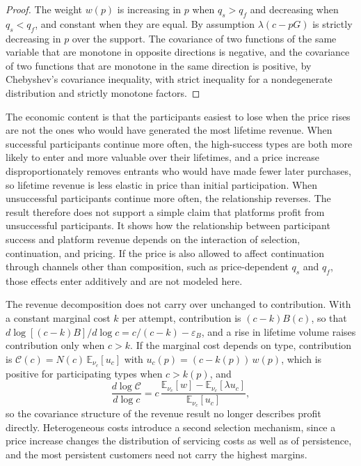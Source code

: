 \documentclass[11pt]{article}
\theoremstyle{remark}
\newcommand{\E}{\mathbb{E}}
\begin{document}
\begin{proof}
The weight $w(p)$ is increasing in $p$ when $q_s>q_f$ and decreasing when $q_s<q_f$, and constant when they are equal. By assumption $\lambda(c-pG)$ is strictly decreasing in $p$ over the support. The covariance of two functions of the same variable that are monotone in opposite directions is negative, and the covariance of two functions that are monotone in the same direction is positive, by Chebyshev's covariance inequality, with strict inequality for a nondegenerate distribution and strictly monotone factors.
\end{proof}

The economic content is that the participants easiest to lose when the price rises are not the ones who would have generated the most lifetime revenue. When successful participants continue more often, the high-success types are both more likely to enter and more valuable over their lifetimes, and a price increase disproportionately removes entrants who would have made fewer later purchases, so lifetime revenue is less elastic in price than initial participation. When unsuccessful participants continue more often, the relationship reverses. The result therefore does not support a simple claim that platforms profit from unsuccessful participants. It shows how the relationship between participant success and platform revenue depends on the interaction of selection, continuation, and pricing. If the price is also allowed to affect continuation through channels other than composition, such as price-dependent $q_s$ and $q_f$, those effects enter additively and are not modeled here.

The revenue decomposition does not carry over unchanged to contribution. With a constant marginal cost $k$ per attempt, contribution is $(c-k)B(c)$, so that $d\log[(c-k)B]/d\log c=c/(c-k)-\varepsilon_B$, and a rise in lifetime volume raises contribution only when $c>k$. If the marginal cost depends on type, contribution is $\mathcal C(c)=N(c)\,\E_{\nu_c}[u_c]$ with $u_c(p)=(c-k(p))\,w(p)$, which is positive for participating types when $c>k(p)$, and
\[
\frac{d\log\mathcal C}{d\log c}=c\,\frac{\E_{\nu_c}[w]-\E_{\nu_c}[\lambda u_c]}{\E_{\nu_c}[u_c]},
\]
so the covariance structure of the revenue result no longer describes profit directly. Heterogeneous costs introduce a second selection mechanism, since a price increase changes the distribution of servicing costs as well as of persistence, and the most persistent customers need not carry the highest margins.
\end{document}
